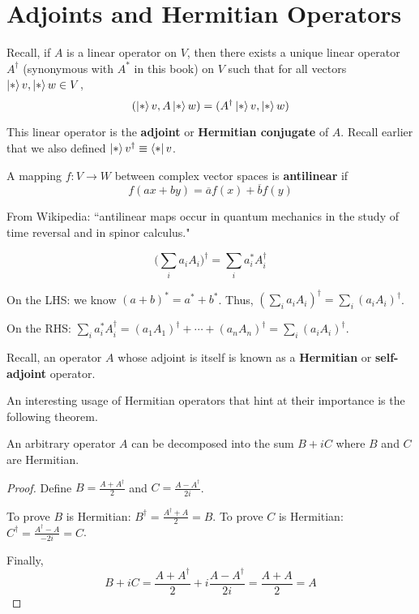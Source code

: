 \section{Adjoints and Hermitian Operators} 

Recall, if $A$ is a linear operator on $V$, then there exists a unique linear operator $A^{\dagger}$ (synonymous with $A^{*}$ in this book) on $V$ such that for all vectors $\ket*{v}, \ket*{w} \in V$, 
$$(\ket*{v}, A\ket*{w}) = (A^{\dagger}\ket*{v}, \ket*{w})$$

This linear operator is the \textbf{adjoint} or \textbf{Hermitian conjugate} of $A$. Recall earlier that we also defined $\ket*{v}^{\dagger} \equiv \bra*{v}$.

\begin{definition}
A mapping $f: V \rightarrow W$ between complex vector spaces is \textbf{antilinear} if 
$$f(ax + by) = \overline{a} f(x) + \overline{b} f(y)$$

From Wikipedia: ``antilinear maps occur in quantum mechanics in the study of time reversal and in spinor calculus."
\end{definition}

\begin{lemma}
$$\Bigg( \sum_{i} a_{i} A_{i} \Bigg)^{\dagger} = \sum_{i} a_{i}^{*} A_{i}^{\dagger}$$
\end{lemma}

\begin{lproof}
On the LHS: we know $(a + b)^{*} = a^{*} + b^{*}$. Thus, $(\sum_{i} a_{i}A_{i})^{\dagger} = \sum_{i} (a_{i}A_{i})^{\dagger}$.

On the RHS: $\sum_{i} a_{i}^{*} A_{i}^{\dagger} = (a_{1} A_{1})^{\dagger} + \cdots + (a_{n} A_{n})^{\dagger} = \sum_{i} (a_{i} A_{i})^{\dagger}$. 
\end{lproof}

Recall, an operator $A$ whose adjoint is itself is known as a \textbf{Hermitian} or \textbf{self-adjoint} operator. 

An interesting usage of Hermitian operators that hint at their importance is the following theorem. 

\begin{theorem}
An arbitrary operator $A$ can be decomposed into the sum $B + iC$ where $B$ and $C$ are Hermitian.
\end{theorem}

\begin{proof}
Define $B = \frac{A + A^{\dagger}}{2}$ and $C = \frac{A - A^{\dagger}}{2i}$. 

To prove $B$ is Hermitian: $B^{\dagger} = \frac{A^{\dagger} + A}{2} = B$. To prove $C$ is Hermitian: $C^{\dagger} = \frac{A^{\dagger} - A}{-2i} = C$. 

Finally, 
$$B + iC = \frac{A + A^{\dagger}}{2} + i \frac{A - A^{\dagger}}{2i} = \frac{A + A}{2} = A$$
\end{proof}

